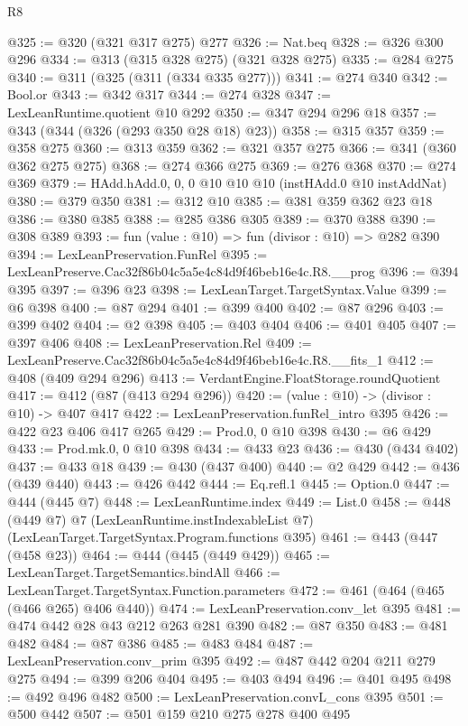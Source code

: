 \begin{lexlean}{R8}
\begin{coremodule}
@325 := @320 (@321 @317 @275) @277
@326 := Nat.beq
@328 := @326 @300 @296
@334 := @313 (@315 @328 @275) (@321 @328 @275)
@335 := @284 @275
@340 := @311 (@325 (@311 (@334 @335 @277)))
@341 := @274 @340
@342 := Bool.or
@343 := @342 @317
@344 := @274 @328
@347 := LexLeanRuntime.quotient @10 @292
@350 := @347 @294 @296 @18
@357 := @343 (@344 (@326 (@293 @350 @28 @18) @23))
@358 := @315 @357
@359 := @358 @275
@360 := @313 @359
@362 := @321 @357 @275
@366 := @341 (@360 @362 @275 @275)
@368 := @274 @366 @275
@369 := @276 @368
@370 := @274 @369
@379 := HAdd.hAdd.{0, 0, 0} @10 @10 @10 (instHAdd.{0} @10 instAddNat)
@380 := @379 @350
@381 := @312 @10
@385 := @381 @359 @362 @23 @18
@386 := @380 @385
@388 := @285 @386 @305
@389 := @370 @388
@390 := @308 @389
@393 := fun (value : @10) => fun (divisor : @10) => @282 @390
@394 := LexLeanPreservation.FunRel
@395 := LexLeanPreserve.Cac32f86b04c5a5e4c84d9f46beb16e4c.R8.__prog
@396 := @394 @395
@397 := @396 @23
@398 := LexLeanTarget.TargetSyntax.Value
@399 := @6 @398
@400 := @87 @294
@401 := @399 @400
@402 := @87 @296
@403 := @399 @402
@404 := @2 @398
@405 := @403 @404
@406 := @401 @405
@407 := @397 @406
@408 := LexLeanPreservation.Rel
@409 := LexLeanPreserve.Cac32f86b04c5a5e4c84d9f46beb16e4c.R8.__fits_1
@412 := @408 (@409 @294 @296)
@413 := VerdantEngine.FloatStorage.roundQuotient
@417 := @412 (@87 (@413 @294 @296))
@420 := (value : @10) -> (divisor : @10) -> @407 @417
@422 := LexLeanPreservation.funRel_intro @395
@426 := @422 @23 @406 @417 @265
@429 := Prod.{0, 0} @10 @398
@430 := @6 @429
@433 := Prod.mk.{0, 0} @10 @398
@434 := @433 @23
@436 := @430 (@434 @402)
@437 := @433 @18
@439 := @430 (@437 @400)
@440 := @2 @429
@442 := @436 (@439 @440)
@443 := @426 @442
@444 := Eq.refl.{1}
@445 := Option.{0}
@447 := @444 (@445 @7)
@448 := LexLeanRuntime.index
@449 := List.{0}
@458 := @448
    (@449 @7)
    @7
    (LexLeanRuntime.instIndexableList @7)
    (LexLeanTarget.TargetSyntax.Program.functions @395)
@461 := @443 (@447 (@458 @23))
@464 := @444 (@445 (@449 @429))
@465 := LexLeanTarget.TargetSemantics.bindAll
@466 := LexLeanTarget.TargetSyntax.Function.parameters
@472 := @461 (@464 (@465 (@466 @265) @406 @440))
@474 := LexLeanPreservation.conv_let @395
@481 := @474 @442 @28 @43 @212 @263 @281 @390
@482 := @87 @350
@483 := @481 @482
@484 := @87 @386
@485 := @483 @484
@487 := LexLeanPreservation.conv_prim @395
@492 := @487 @442 @204 @211 @279 @275
@494 := @399 @206 @404
@495 := @403 @494
@496 := @401 @495
@498 := @492 @496 @482
@500 := LexLeanPreservation.convL_cons @395
@501 := @500 @442
@507 := @501 @159 @210 @275 @278 @400 @495

\end{coremodule}
\end{lexlean}
